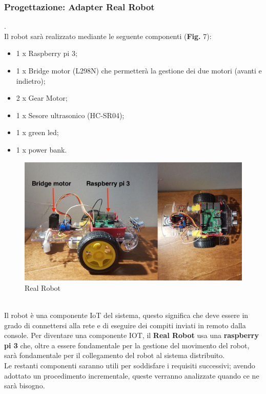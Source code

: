 \documentclass{llncs}
\begin{document}
\subsubsection{Progettazione: Adapter Real Robot}.
\label{ProgettazioneReqRR}
\vspace*{1ex}
\\
Il robot sar\`a realizzato mediante le seguente componenti (\textbf{Fig.} 7):
\begin{itemize}
    \item 1 x Raspberry pi 3;
    \item 1 x Bridge motor (L298N) che permetter\`a la gestione dei due motori (avanti e indietro);
    \item 2 x Gear Motor;
    \item 1 x Sesore ultrasonico (HC-SR04);
    \item 1 x green led;
    \item 1 x power bank.
\end{itemize}
\begin{figure}
    \centering
    \includegraphics[width=1\textwidth]{Immagini/RealRobot.jpg}
    \caption{Real Robot}
    \label{fig:my_label}
\end{figure}
\vspace*{1ex}
\\
Il robot \`e una componente IoT del sistema, questo significa che deve essere in grado di connettersi alla rete e di eseguire dei compiti inviati in remoto dalla console. Per diventare una componente IOT, il \textbf{Real Robot} usa una \textbf{raspberry pi 3} che, oltre a essere fondamentale per la gestione del movimento del robot, sar\`a fondamentale per il collegamento del robot al sistema distribuito.\\
Le restanti componenti saranno utili per soddisfare i requisiti successivi; avendo adottato un procedimento incrementale, queste verranno analizzate quando ce ne sar\`a bisogno.\\
\end{document}
